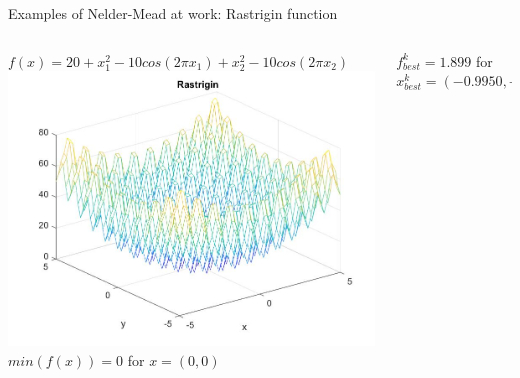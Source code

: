 \documentclass{beamer}
\begin{document}
\begin{frame}{Examples of Nelder-Mead at work: Rastrigin function}
\begin{columns}
\begin{column}{0.49\linewidth}
	\small $f(x) = 20 + x_1^2 - 10cos(2\pi x_1) + x_2^2 - 10cos(2\pi x_2)$ \\
	\includegraphics[width=0.95\linewidth]{rastriginFunction}	 \\
	$min(f(x))= 0 $ for $x = (0,0)$
\end{column}
\begin{column}{0.49\linewidth}
	\begin{figure}
	\end{figure}	
	$f^k_{best}= 1.899 $ for $x^k_{best}= (-0.9950, -0.9950)$
\end{column}
\end{columns}
\end{frame}
\end{document}
